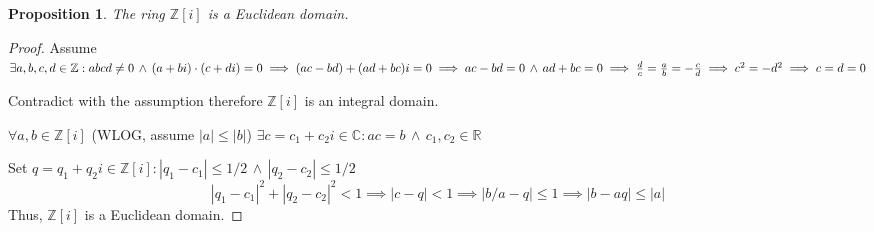 \documentclass{article}
\newtheorem*{prop}{Proposition}
\theoremstyle{definition}\newtheorem{definition}{Definition}
\begin{document}
	\begin{prop}
		The ring $\mathbb Z[i]$ is a Euclidean domain.
	\end{prop}
			
	\begin{proof}
		Assume $\exists a,b,c,d \in \mathbb Z : abcd \neq 0\, \land \, (a+bi)\cdot (c+di)=0 \\ \implies (ac-bd)+(ad+bc)i=0 \implies ac-bd=0 \, \land \, ad+bc=0 \\ \implies \frac dc = \frac ab = -\frac cd \implies c^2=-d^2 \implies c=d=0 $
		
		Contradict with the assumption therefore $\mathbb Z[i]$ is an integral domain. 
		
		$\forall a,b \in \mathbb Z[i]$ (WLOG, assume $|a| \leq |b|$) $\exists c=c_1+c_2i \in  \mathbb C : ac=b \, \land \, c_1,c_2 \in \mathbb R$ 
		
		Set $q=q_1+q_2i \in \mathbb Z[i]: |q_1-c_1|\leq 1/2 \, \land \, |q_2-c_2|\leq 1/2$ 
		$$
		|q_1-c_1|^2+|q_2-c_2|^2< 1 \implies |c-q|<1 \implies |{b}/{a}-q| \leq 1 \implies |b-aq|\leq |a|
		$$ 
		Thus, $\mathbb Z[i]$ is a Euclidean domain.
	\end{proof}
\end{document}
